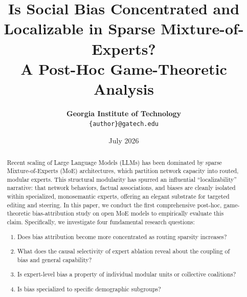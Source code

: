 \documentclass[11pt,a4paper]{article}
\title{\textbf{Is Social Bias Concentrated and Localizable in Sparse Mixture-of-Experts?\\A Post-Hoc Game-Theoretic Analysis}}
\author{\textbf{Georgia Institute of Technology} \\ \texttt{\{author\}@gatech.edu}}
\date{July 2026}
\begin{document}
\maketitle

\begin{abstract}
Recent scaling of Large Language Models (LLMs) has been dominated by sparse Mixture-of-Experts (MoE) architectures, which partition network capacity into routed, modular experts. This structural modularity has spurred an influential ``localizability'' narrative: that network behaviors, factual associations, and biases are cleanly isolated within specialized, monosemantic experts, offering an elegant substrate for targeted editing and steering. In this paper, we conduct the first comprehensive post-hoc, game-theoretic bias-attribution study on open MoE models to empirically evaluate this claim. Specifically, we investigate four fundamental research questions:
\begin{enumerate}
    \item Does bias attribution become more concentrated as routing sparsity increases?
    \item What does the causal selectivity of expert ablation reveal about the coupling of bias and general capability?
    \item Is expert-level bias a property of individual modular units or collective coalitions?
    \item Is bias specialized to specific demographic subgroups?
\end{enumerate}


\end{abstract}
\end{document}
